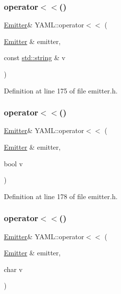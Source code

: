 \subsubsection{\texorpdfstring{operator$<$$<$()}{operator<<()}\hspace{0.1cm}{\footnotesize\ttfamily [12/35]}}
{\footnotesize\ttfamily \mbox{\hyperlink{class_y_a_m_l_1_1_emitter}{Emitter}}\& Y\+A\+M\+L\+::operator$<$$<$ (\begin{DoxyParamCaption}\item[{\mbox{\hyperlink{class_y_a_m_l_1_1_emitter}{Emitter}} \&}]{emitter,  }\item[{const \mbox{\hyperlink{glad_8h_ac83513893df92266f79a515488701770}{std\+::string}} \&}]{v }\end{DoxyParamCaption})\hspace{0.3cm}{\ttfamily [inline]}}



Definition at line 175 of file emitter.\+h.

\mbox{\label{namespace_y_a_m_l_ad2317fbe93846e871edbd55c58d27a2a}} 
\subsubsection{\texorpdfstring{operator$<$$<$()}{operator<<()}\hspace{0.1cm}{\footnotesize\ttfamily [13/35]}}
{\footnotesize\ttfamily \mbox{\hyperlink{class_y_a_m_l_1_1_emitter}{Emitter}}\& Y\+A\+M\+L\+::operator$<$$<$ (\begin{DoxyParamCaption}\item[{\mbox{\hyperlink{class_y_a_m_l_1_1_emitter}{Emitter}} \&}]{emitter,  }\item[{bool}]{v }\end{DoxyParamCaption})\hspace{0.3cm}{\ttfamily [inline]}}



Definition at line 178 of file emitter.\+h.

\mbox{\label{namespace_y_a_m_l_a48cc2eced24b95c83b7b5e22ef0568dd}} 
\subsubsection{\texorpdfstring{operator$<$$<$()}{operator<<()}\hspace{0.1cm}{\footnotesize\ttfamily [14/35]}}
{\footnotesize\ttfamily \mbox{\hyperlink{class_y_a_m_l_1_1_emitter}{Emitter}}\& Y\+A\+M\+L\+::operator$<$$<$ (\begin{DoxyParamCaption}\item[{\mbox{\hyperlink{class_y_a_m_l_1_1_emitter}{Emitter}} \&}]{emitter,  }\item[{char}]{v }\end{DoxyParamCaption})\hspace{0.3cm}{\ttfamily [inline]}}



